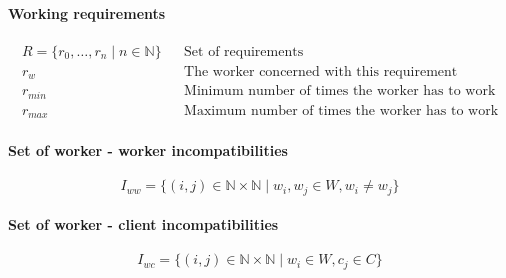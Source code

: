 \documentclass[../../thesis.tex]{subfiles}
\begin{document}
\paragraph{Working requirements}

\begin{align*}
    R = \{ r_0, \dots, r_n \mid n \in \mathbb{N} \} && \text{Set of requirements} \\ 
    r_{w}   && \text{The worker concerned with this requirement} \\
    r_{min} && \text{Minimum number of times the worker has to work} \\
    r_{max} && \text{Maximum number of times the worker has to work}
\end{align*}


\paragraph{Set of worker - worker incompatibilities}

\begin{equation*}
    {I_{ww} = \{ ({i},{j}) \in \mathbb{N} \times \mathbb{N} \mid w_i, w_j \in W, w_i \neq w_j \}}
\end{equation*}


\paragraph{Set of worker - client incompatibilities}
\begin{equation*}
    I_{wc} = \{ (i, j) \in \mathbb{N} \times \mathbb{N} \mid w_i \in W, c_j \in C \}
\end{equation*}



  
\end{document}

